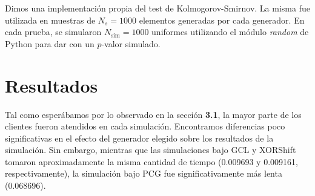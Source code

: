 \documentclass[a4paper, 12pt]{article}
\begin{document}
Dimos una implementación propia del test de Kolmogorov-Smirnov. La misma fue
utilizada en muestras de $N_s = 1000$ elementos generadas por cada generador. En
cada prueba, se simularon $N_{\text{sim}} = 1000$ uniformes utilizando el módulo
\textit{random} de Python para dar con un $p$-valor simulado.

\section{Resultados}

Tal como esperábamos por lo observado en la sección \textbf{3.1}, la mayor parte
de los clientes fueron atendidos en cada simulación. Encontramos diferencias
poco significativas en el efecto del generador elegido sobre los resultados de
la simulación. Sin embargo, mientras que las simulaciones bajo GCL y XORShift
tomaron aproximadamente la misma cantidad de tiempo (0.009693 y 0.009161,
respectivamente), la simulación bajo PCG fue significativamente más lenta 
(0.068696).
\end{document}
